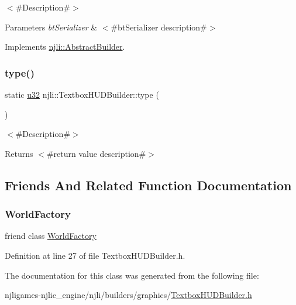 $<$\#\+Description\#$>$


\begin{DoxyParams}{Parameters}
{\em bt\+Serializer} & $<$\#bt\+Serializer description\#$>$ \\
\hline
\end{DoxyParams}


Implements \mbox{\hyperlink{classnjli_1_1_abstract_builder_ab66b774e02ccb9da554c9aab7fa6d981}{njli\+::\+Abstract\+Builder}}.

\mbox{\label{classnjli_1_1_textbox_h_u_d_builder_ae56de0f25a73f5126f1f133943c42464}} 
\subsubsection{\texorpdfstring{type()}{type()}}
{\footnotesize\ttfamily static \mbox{\hyperlink{_util_8h_a10e94b422ef0c20dcdec20d31a1f5049}{u32}} njli\+::\+Textbox\+H\+U\+D\+Builder\+::type (\begin{DoxyParamCaption}{ }\end{DoxyParamCaption})\hspace{0.3cm}{\ttfamily [static]}}

$<$\#\+Description\#$>$

\begin{DoxyReturn}{Returns}
$<$\#return value description\#$>$ 
\end{DoxyReturn}


\subsection{Friends And Related Function Documentation}
\mbox{\label{classnjli_1_1_textbox_h_u_d_builder_acb96ebb09abe8f2a37a915a842babfac}} 
\subsubsection{\texorpdfstring{World\+Factory}{WorldFactory}}
{\footnotesize\ttfamily friend class \mbox{\hyperlink{classnjli_1_1_world_factory}{World\+Factory}}\hspace{0.3cm}{\ttfamily [friend]}}



Definition at line 27 of file Textbox\+H\+U\+D\+Builder.\+h.



The documentation for this class was generated from the following file\+:\begin{DoxyCompactItemize}
\item 
njligames-\/njlic\+\_\+engine/njli/builders/graphics/\mbox{\hyperlink{_textbox_h_u_d_builder_8h}{Textbox\+H\+U\+D\+Builder.\+h}}\end{DoxyCompactItemize}
